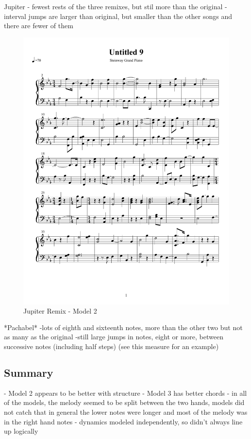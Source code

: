 \documentclass{article} %
\begin{document}
Jupiter 
- fewest rests of the three remixes, but stil more than the original
-interval jumps are larger than original, but smaller than the other songs and there are fewer of them


\begin{figure}[H]
\centering
\caption{Jupiter Remix - Model 2}
\includegraphics [scale = 0.6] {JupiterRemix2H-cropped.pdf}
\end{figure}

*Pachabel*
-lots of eighth and sixteenth notes, more than the other two but not as many as the original
-still large jumps in notes, eight or more, between successive notes (including half steps) (see this measure for an example)

\subsection{Summary}
- Model 2 appears to be better with structure
- Model 3 has better chords
- in all of the models, the melody seemed to be split between the two hands, models did not catch that in general the lower notes were longer and most of the melody was in the right hand notes
- dynamics modeled independently, so didn't always line up logically
\end{document}
